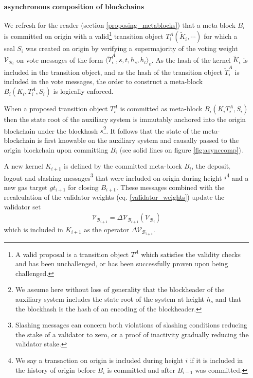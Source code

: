 \documentclass[12pt,a4paper]{article}
\begin{document}
\paragraph{asynchronous composition of blockchains} We refresh for the reader (section \ref{proposing_metablocks}) that a meta-block $B_i$ is committed on origin with a valid\footnote{
  A valid proposal is a transition object $T^A$ which satisfies the validity checks and has been unchallenged, or has been successfully proven upon being challenged.
} transition object $T^A_i(\tilde{K}_i, \cdots)$ for which a seal $S_i$ was created on origin by verifying a supermajority of the voting weight $\mathcal{V}_{\mathcal{B}_i}$ on vote messages of the form $\langle \tilde{T}^A_i, s, t, h_s, h_t \rangle_v$.
As the hash of the kernel $\tilde{K}_i$ is included in the transition object, and as the hash of the transition object $\tilde{T}^A_i$ is included in the vote messages, the order to construct a meta-block $B_i(K_i, T^A_i, S_i)$ is logically enforced.

When a proposed transition object $T^A_i$ is committed as meta-block $B_i(K_i T^A_i, S_i)$ then the state root of the auxiliary system is immutably anchored into the origin blockchain under the blockhash $s$\footnote{
  We assume here without loss of generality that the blockheader of the auxiliary system includes the state root of the system at height $h_s$ and that the blockhash is the hash of an encoding of the blockheader.}.
It follows that the state of the meta-blockchain is first knowable on the auxiliary system and causally passed to the origin blockchain upon committing $B_i$ (see solid lines on figure \ref{fig:asynccomp}).

A new kernel $K_{i+1}$ is defined by the committed meta-block $B_i$, the deposit, logout and slashing messages\footnote{
  Slashing messages can concern both violations of slashing conditions reducing the stake of a validator to zero, or a proof of inactivity gradually reducing the validator stake.}
that were included on origin during height $i$\footnote{
  We say a transaction on origin is included during height $i$ if it is included in the history of origin before $B_{i}$ is committed and after $B_{i-1}$ was committed.}
and a new gas target $gt_{i+1}$ for closing $B_{i+1}$.
These messages combined with the recalculation of the validator weights (eq. \ref{validator_weights}) update the validator set
\begin{align}
  \mathcal{V}_{\mathcal{B}_{i+1}} = \Delta\mathcal{V}_{\mathcal{B}_{i+1}}(\mathcal{V}_{\mathcal{B}_{i}})
\end{align}
which is included in $K_{i+1}$ as the operator $\Delta\mathcal{V}_{\mathcal{B}_{i+1}}$. 
\end{document}
